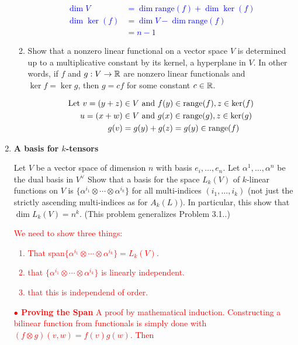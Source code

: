 \documentclass[10pt,a4paper]{report}
\newcommand{\RANGE}{\text{range}}
\newcommand{\RED}[1]{\textcolor{red}{#1}}
\newcommand{\BLUE}[1]{\textcolor{blue}{#1}}
\begin{document}
\begin{enumerate}[label=3.\arabic*.]
\begin{enumerate}[label=(\alph*)]
		\BLUE{\begin{align*}
			\dim V &= \dim \text{range} (f) + \dim \ker (f) \\
			\dim \ker (f) &= \dim V - \dim \text{range} (f) \\
			&= n-1
		\end{align*}
		}
		
		\item Show that a nonzero linear functional on a vector space $V$ is determined up to a multiplicative constant by its kernel, a hyperplane in $V$.  In other words, if $f$ and $g: V\to \mathbb{R}$ are nonzero linear functionals and $\ker f = \ker g$, then $g=cf$ for some constant $c \in \mathbb{R}$.
		
		\BLUE{\begin{align*}
			\LET v = (y+z) &\in V \AND f(y) \in \RANGE(f), z \in \ker(f) \\
			 u = (x +w) &\in V \AND g(x) \in \RANGE(g), z \in \ker(g) \\
			 g(v) &= g(y)+g(z) = g(y) \in \RANGE(f)
		\end{align*}
		}
		
	\end{enumerate}
		
	\item \textbf{A basis for $k$-tensors}
		
	Let $V$ be a vector space of dimension $n$ with basis $e_i,\dots,e_n$.  Let $\alpha^1,\dots, \alpha^n$ be the dual basis in $V^\vee$  Show that a basis for the space $L_k(V)$ of $k$-linear functions on $V$ is $\{\alpha^{i_1}\otimes \cdots \otimes \alpha^{i_k}\}$ for all multi-indices $(i_1,\dots, i_k)$ (not just the strictly ascending multi-indices as for $A_k(L)$).  In particular, this show that $\dim L_k(V) = n^k$.  (This problem generalizes Problem 3.1..)
	
	\RED{We need to show three things:
	\begin{enumerate}
		\item That span$\{\alpha^{i_1}\otimes \cdots \otimes \alpha^{i_k}\} = L_k(V)$.
		\item that $\{\alpha^{i_1}\otimes \cdots \otimes \alpha^{i_k}\}$ is linearly independent.
		\item that this is independend of order.
	\end{enumerate}		
	\textbf{$\bullet$ Proving the Span} A proof by mathematical induction.  Constructing a bilinear function from functionals is simply done with $(f \otimes g)(v,w)= f(v)g(w)$.  Then
	}
		

\end{enumerate}
\end{document}
